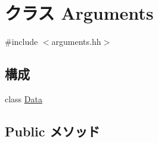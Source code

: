 \hypertarget{classArguments}{
\section{クラス Arguments}
\label{classArguments}
}


{\ttfamily \#include $<$arguments.hh$>$}\subsection*{構成}
\begin{DoxyCompactItemize}
\item 
class \hyperlink{classArguments_1_1Data}{Data}
\end{DoxyCompactItemize}
\subsection*{Public メソッド}
